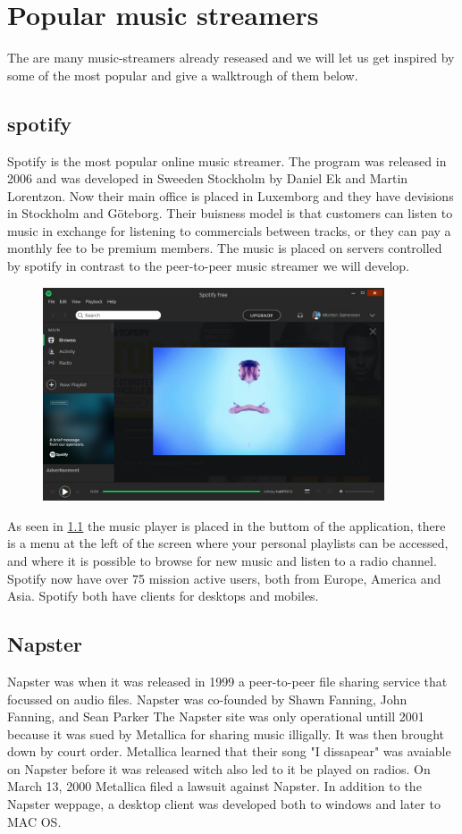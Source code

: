 \chapter{Popular music streamers}
The are many music-streamers already reseased and we will let us get inspired by some of the most popular and give a walktrough of them below.

\section{spotify}
Spotify is the most popular online music streamer. The program was released in 2006 and was developed in Sweeden Stockholm by Daniel Ek and Martin Lorentzon. Now their main office is placed in Luxemborg and they have devisions in Stockholm and Göteborg. Their buisness model is that customers can listen to music in exchange for listening to commercials between tracks, or they can pay a monthly fee to be premium members.
The music is placed on servers controlled by spotify in contrast to the peer-to-peer music streamer we will develop.
\begin{figure}[p]
  \centering
  \includegraphics[width=0.9\textwidth]{gfx/Spotify_desktop.jpg}
  \label{spotify_desktop}
\end{figure}
As seen in \ref{spotify_desktop} the music player is placed in the buttom of the application, there is a menu at the left of the screen where your personal playlists can be accessed, and where it is possible to browse for new music and listen to a radio channel.
Spotify now have over 75 mission active users, both from Europe, America and Asia. Spotify both have clients for desktops and mobiles.

\section{Napster}
Napster was when it was released in 1999 a peer-to-peer file sharing service that focussed on audio files. Napster was co-founded by Shawn Fanning, John Fanning, and Sean Parker The Napster site was only operational untill 2001 because it was sued by Metallica for sharing music illigally. It was then brought down by court order. Metallica learned that their song "I dissapear" was avaiable on Napster before it was released witch also led to it be played on radios. On March 13, 2000 Metallica filed a lawsuit against Napster. In addition to the Napster weppage, a desktop client was developed both to windows and later to MAC OS. 
